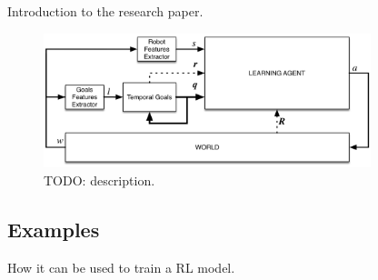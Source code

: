 Introduction to the research paper.
\begin{figure}[h]
    \centering
    \includegraphics[width=0.85\textwidth]{images/rl-temporalgoals-pipeline.png}
    \caption{TODO: description.}
    \label{fig:rl-temporalgoals-pipeline}
\end{figure}

\subsection{Examples}
How it can be used to train a RL model.
